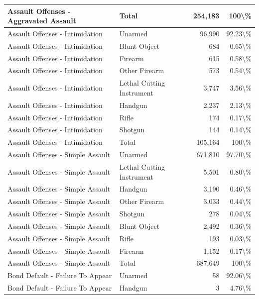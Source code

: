 \documentclass[
]{krantz}
\begin{document}
\begin{longtable}[t]{l|l|r|r}
Assault Offenses - Aggravated Assault & Total & 254,183 & 100\textbackslash{}\%\\
\hline
Assault Offenses - Intimidation & Unarmed & 96,990 & 92.23\textbackslash{}\%\\
\hline
Assault Offenses - Intimidation & Blunt Object & 684 & 0.65\textbackslash{}\%\\
\hline
Assault Offenses - Intimidation & Firearm & 615 & 0.58\textbackslash{}\%\\
\hline
Assault Offenses - Intimidation & Other Firearm & 573 & 0.54\textbackslash{}\%\\
\hline
Assault Offenses - Intimidation & Lethal Cutting Instrument & 3,747 & 3.56\textbackslash{}\%\\
\hline
Assault Offenses - Intimidation & Handgun & 2,237 & 2.13\textbackslash{}\%\\
\hline
Assault Offenses - Intimidation & Rifle & 174 & 0.17\textbackslash{}\%\\
\hline
Assault Offenses - Intimidation & Shotgun & 144 & 0.14\textbackslash{}\%\\
\hline
Assault Offenses - Intimidation & Total & 105,164 & 100\textbackslash{}\%\\
\hline
Assault Offenses - Simple Assault & Unarmed & 671,810 & 97.70\textbackslash{}\%\\
\hline
Assault Offenses - Simple Assault & Lethal Cutting Instrument & 5,501 & 0.80\textbackslash{}\%\\
\hline
Assault Offenses - Simple Assault & Handgun & 3,190 & 0.46\textbackslash{}\%\\
\hline
Assault Offenses - Simple Assault & Other Firearm & 3,033 & 0.44\textbackslash{}\%\\
\hline
Assault Offenses - Simple Assault & Shotgun & 278 & 0.04\textbackslash{}\%\\
\hline
Assault Offenses - Simple Assault & Blunt Object & 2,492 & 0.36\textbackslash{}\%\\
\hline
Assault Offenses - Simple Assault & Rifle & 193 & 0.03\textbackslash{}\%\\
\hline
Assault Offenses - Simple Assault & Firearm & 1,152 & 0.17\textbackslash{}\%\\
\hline
Assault Offenses - Simple Assault & Total & 687,649 & 100\textbackslash{}\%\\
\hline
Bond Default - Failure To Appear & Unarmed & 58 & 92.06\textbackslash{}\%\\
\hline
Bond Default - Failure To Appear & Handgun & 3 & 4.76\textbackslash{}\%\\

\end{longtable}
\end{document}
